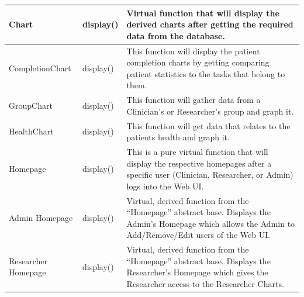 \documentclass{article}
\begin{document}
\begin{longtable}[t]{|p{1.5in}|p{2in}|p{2.5in}|}
\hline %

Chart
      & display() & Virtual function that will display the derived charts after getting the required data from the database. \\
\hline %

CompletionChart
      & display() & This function will display the patient completion charts by getting comparing patient statistics to the tasks that belong to them. \\
\hline %

GroupChart
      & display() & This function will gather data from a Clinician's or Researcher's group and graph it. \\
      
\hline %

HealthChart
      & display() & This function will get data that relates to the patients health and graph it. \\
      
      \hline
      
Homepage

	& display() & This is a pure virtual function that will display the respective homepages after a specific user (Clinician, Researcher, or Admin) logs into the Web UI.  \\

	\cline{2-3}

\hline %

Admin Homepage
      & display() & Virtual, derived function from the ``Homepage'' abstract base. Displays the Admin's Homepage which allows the Admin to Add/Remove/Edit users of the Web UI.  \\
\cline{2-3}

\hline 

Researcher Homepage
		& display() & Virtual, derived function from the ``Homepage'' abstract base. Displays the Researcher's Homepage which gives the Researcher access to the Researcher Charts. \\
\cline{2-3}


\end{longtable}
\end{document}
